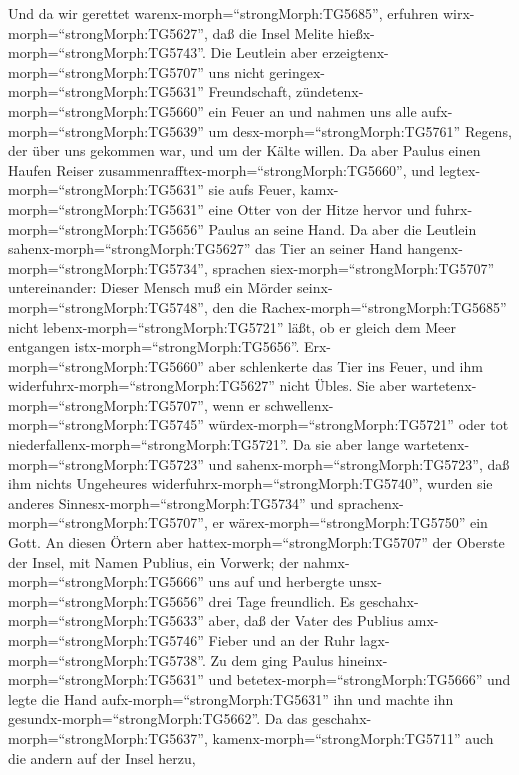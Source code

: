  Und da wir gerettet warenx-morph=``strongMorph:TG5685'',
erfuhren wirx-morph=``strongMorph:TG5627'', daß die Insel Melite
hießx-morph=``strongMorph:TG5743''.  Die Leutlein aber
erzeigtenx-morph=``strongMorph:TG5707'' uns nicht
geringex-morph=``strongMorph:TG5631'' Freundschaft,
zündetenx-morph=``strongMorph:TG5660'' ein Feuer an und nahmen uns alle
aufx-morph=``strongMorph:TG5639'' um desx-morph=``strongMorph:TG5761''
Regens, der über uns gekommen war, und um der Kälte willen. 
Da aber Paulus einen Haufen Reiser
zusammenrafftex-morph=``strongMorph:TG5660'', und
legtex-morph=``strongMorph:TG5631'' sie aufs Feuer,
kamx-morph=``strongMorph:TG5631'' eine Otter von der Hitze hervor und
fuhrx-morph=``strongMorph:TG5656'' Paulus an seine Hand.  Da
aber die Leutlein sahenx-morph=``strongMorph:TG5627'' das Tier an seiner
Hand hangenx-morph=``strongMorph:TG5734'', sprachen
siex-morph=``strongMorph:TG5707'' untereinander: Dieser Mensch muß ein
Mörder seinx-morph=``strongMorph:TG5748'', den die
Rachex-morph=``strongMorph:TG5685'' nicht
lebenx-morph=``strongMorph:TG5721'' läßt, ob er gleich dem Meer
entgangen istx-morph=``strongMorph:TG5656''. 
Erx-morph=``strongMorph:TG5660'' aber schlenkerte das Tier ins Feuer,
und ihm widerfuhrx-morph=``strongMorph:TG5627'' nicht Übles.
 Sie aber wartetenx-morph=``strongMorph:TG5707'', wenn er
schwellenx-morph=``strongMorph:TG5745''
würdex-morph=``strongMorph:TG5721'' oder tot
niederfallenx-morph=``strongMorph:TG5721''. Da sie aber lange
wartetenx-morph=``strongMorph:TG5723'' und
sahenx-morph=``strongMorph:TG5723'', daß ihm nichts Ungeheures
widerfuhrx-morph=``strongMorph:TG5740'', wurden sie anderes
Sinnesx-morph=``strongMorph:TG5734'' und
sprachenx-morph=``strongMorph:TG5707'', er
wärex-morph=``strongMorph:TG5750'' ein Gott.  An diesen
Örtern aber hattex-morph=``strongMorph:TG5707'' der Oberste der Insel,
mit Namen Publius, ein Vorwerk; der nahmx-morph=``strongMorph:TG5666''
uns auf und herbergte unsx-morph=``strongMorph:TG5656'' drei Tage
freundlich.  Es geschahx-morph=``strongMorph:TG5633'' aber,
daß der Vater des Publius amx-morph=``strongMorph:TG5746'' Fieber und an
der Ruhr lagx-morph=``strongMorph:TG5738''. Zu dem ging Paulus
hineinx-morph=``strongMorph:TG5631'' und
betetex-morph=``strongMorph:TG5666'' und legte die Hand
aufx-morph=``strongMorph:TG5631'' ihn und machte ihn
gesundx-morph=``strongMorph:TG5662''.  Da das
geschahx-morph=``strongMorph:TG5637'',
kamenx-morph=``strongMorph:TG5711'' auch die andern auf der Insel herzu,
